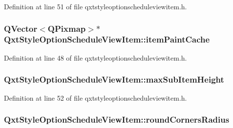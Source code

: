 Definition at line 51 of file qxtstyleoptionscheduleviewitem.\-h.

\hypertarget{class_qxt_style_option_schedule_view_item_af23054599e3bdffbef296515e51dcbf1}{
\subsubsection[{item\-Paint\-Cache}]{\setlength{\rightskip}{0pt plus 5cm}Q\-Vector$<$Q\-Pixmap$>$$\ast$ Qxt\-Style\-Option\-Schedule\-View\-Item\-::item\-Paint\-Cache\hspace{0.3cm}{\ttfamily [mutable]}}}\label{class_qxt_style_option_schedule_view_item_af23054599e3bdffbef296515e51dcbf1}


Definition at line 48 of file qxtstyleoptionscheduleviewitem.\-h.

\hypertarget{class_qxt_style_option_schedule_view_item_adf84c02f222d3fa97fb6520625893c1b}{
\subsubsection[{max\-Sub\-Item\-Height}]{ Qxt\-Style\-Option\-Schedule\-View\-Item\-::max\-Sub\-Item\-Height}}\label{class_qxt_style_option_schedule_view_item_adf84c02f222d3fa97fb6520625893c1b}


Definition at line 52 of file qxtstyleoptionscheduleviewitem.\-h.

\hypertarget{class_qxt_style_option_schedule_view_item_a202e7285e0a3c6b2302f97759d08c1de}{
\subsubsection[{round\-Corners\-Radius}]{ Qxt\-Style\-Option\-Schedule\-View\-Item\-::round\-Corners\-Radius}}\label{class_qxt_style_option_schedule_view_item_a202e7285e0a3c6b2302f97759d08c1de}


